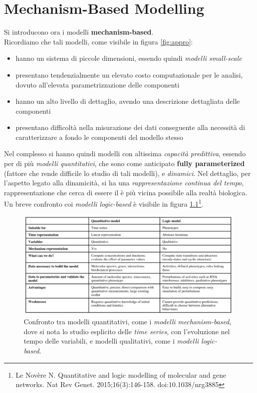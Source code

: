 \documentclass[a4paper,12pt, oneside]{book}
\begin{document}
\chapter{Mechanism-Based Modelling}
Si introducono ora i modelli \textbf{mechanism-based}.\\
Ricordiamo che tali modelli, come visibile in figura \ref{fig:appro}:
\begin{itemize}
  \item hanno un sistema di piccole dimensioni, essendo quindi \textit{modelli
    small-scale} 
  \item presentano tendenzialmente un elevato costo computazionale per le
  analisi, dovuto all'elevata parametrizzazione delle componenti
  \item hanno un alto livello di dettaglio, avendo una descrizione dettagliata
  delle componenti
  \item presentano difficoltà nella misurazione dei dati conseguente alla
  necessità di caratterizzare a fondo le componenti del modello stesso
\end{itemize}
Nel complesso si hanno quindi modelli con altissima \textit{capacità
  predittiva}, essendo per di più \textit{modelli quantitativi}, che sono come
anticipato \textbf{fully parameterized} (fattore che rende difficile lo studio
di tali modelli), e
\textit{dinamici}. Nel dettaglio, per l'aspetto legato alla dinamicità, si ha
una \textit{rappresentazione continua del tempo}, rappresentazione che cerca di
essere il è più vicina possibile alla realtà biologica. Un breve confronto coi 
\textit{modelli logic-based} è visibile in figura \ref{fig:meclog}\footnote{Le
  Novère N. Quantitative and logic modelling of molecular and gene networks. Nat
  Rev Genet. 2015;16(3):146-158. doi:10.1038/nrg3885}. \\  
\begin{figure}
  \centering
  \includegraphics[scale = 0.25]{img/meclog.jpg}
  \caption{Confronto tra modelli quantitativi, come i \textit{modelli
    mechanism-based}, dove si nota lo studio esplicito delle \textit{time
    series}, con l'evoluzione nel tempo delle variabili, e
  modelli qualitativi, come i \textit{modelli logic-based}.}  
  \label{fig:meclog}
\end{figure}
\end{document}
